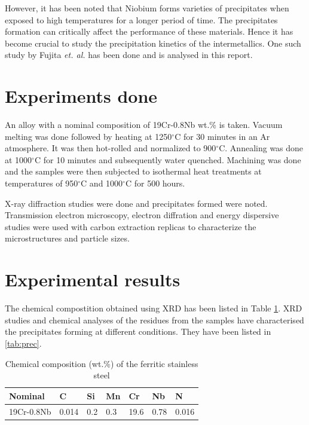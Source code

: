 \documentclass[12pt]{article}
\begin{document}
 However, it has been noted that Niobium forms varieties of precipitates when exposed to high temperatures for a longer period of time. The precipitates formation can critically affect the performance of these materials. Hence it has become crucial to study the precipitation kinetics of the intermetallics. One such study by Fujita \textit{et. al.} has been done and is analysed in this report.


\section{Experiments done}

 An alloy with a nominal composition of 19Cr-0.8Nb wt.\% is taken. Vacuum melting was done followed by heating at 1250$^\circ$C for 30 minutes in an Ar atmosphere. It was then hot-rolled and normalized to 900$^\circ$C. Annealing was done at 1000$^\circ$C for 10 minutes and subsequently water quenched. Machining was done and the samples were then subjected to isothermal heat treatments at temperatures of 950$^\circ$C and 1000$^\circ$C for 500 hours. 

X-ray diffraction studies were done and precipitates formed were noted. Transmission electron microscopy, electron diffration and energy dispersive studies were used with carbon extraction replicas to characterize the microstructures and particle sizes.

\section{Experimental results}

 The chemical compostition obtained using XRD has been listed in Table \ref{tab:nom}. XRD studies and chemical analyses of the residues from the samples have characterised the precipitates forming at different conditions. They have been listed in \ref{tab:prec}.
\begin{table}
\centering
\caption{Chemical composition (wt.\%) of the ferritic stainless steel}
\begin{tabular}{ l l l l l l l }
\hline
\hline
Nominal & C & Si & Mn & Cr & Nb & N \\
\hline
19Cr-0.8Nb & 0.014 & 0.2 & 0.3 & 19.6 & 0.78 & 0.016 \\
\hline
\hline
\end{tabular}
\label{tab:nom}
\end{table}
\end{document}
